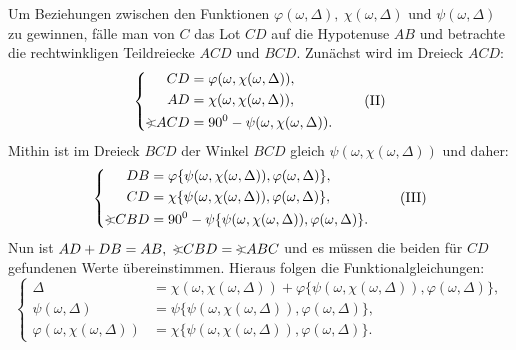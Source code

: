 \indent Um Beziehungen zwischen den Funktionen \(\varphi(\omega,\Delta),\ \chi(\omega,\Delta)\) und \(\psi(\omega,\Delta)\) zu gewinnen, fälle man von \(C\) das Lot \(CD\) auf die Hypotenuse \(AB\) und betrachte die rechtwinkligen Teildreiecke \(ACD\) und \(BCD\). Zunächst wird im Dreieck \(ACD\):
\begin{equation}
\left\{\begin{aligned}CD&=\varphi(\omega,\chi(\omega,\Delta)),\\AD&=\chi(\omega,\chi(\omega,\Delta)),\\\GeomAngle ACD&=90^{0}-\psi(\omega,\chi(\omega,\Delta)).\end{aligned}\right.\tag{II}
\end{equation}
\noindent Mithin ist im Dreieck \(BCD\) der Winkel \(BCD\) gleich \(\psi(\omega,\chi(\omega,\Delta))\) und daher:
\begin{equation}
\left\{\begin{aligned}
DB&=\varphi\{\psi(\omega,\chi(\omega,\Delta)),\varphi(\omega,\Delta)\},\\
CD&=\chi\{\psi(\omega,\chi(\omega,\Delta)),\varphi(\omega,\Delta)\},\\
\GeomAngle CBD&=90^{0}-\psi\{\psi(\omega,\chi(\omega,\Delta)),\varphi(\omega,\Delta)\}.
\end{aligned}\right.\tag{III}
\end{equation}
\noindent Nun ist \(AD+DB=AB,\ \GeomAngle CBD=\GeomAngle ABC\) und es müssen die beiden für \(CD\) gefundenen Werte übereinstimmen. Hieraus folgen die Funktionalgleichungen:
\begin{equation}
\left\{\begin{aligned}
\Delta&=\chi(\omega,\chi(\omega,\Delta))+\varphi\{\psi(\omega,\chi(\omega,\Delta)),\varphi(\omega,\Delta)\},\\
\psi(\omega,\Delta)&=\psi\{\psi(\omega,\chi(\omega,\Delta)),\varphi(\omega,\Delta)\},\\
\varphi(\omega,\chi(\omega,\Delta))&=\chi\{\psi(\omega,\chi(\omega,\Delta)),\varphi(\omega,\Delta)\}.
\end{aligned}\right.\tag{IV}
\end{equation}

